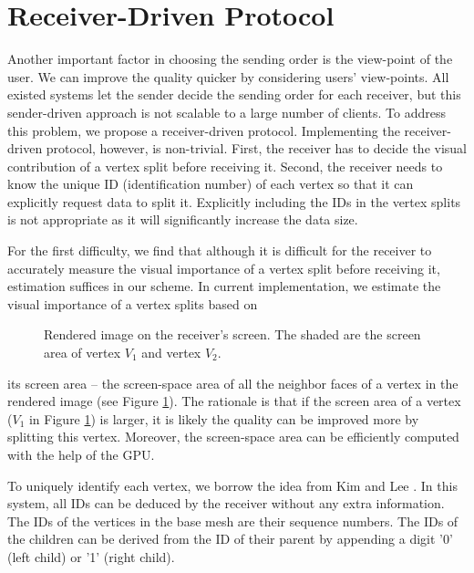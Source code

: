 \documentclass{sig-alt-release2}
\begin{document}
\section{Receiver-Driven Protocol}
\label{c:view}
    Another important factor in choosing the sending order is the view-point of the user.
    We can improve the quality quicker by considering users' view-points. 
    All existed systems let the sender decide the sending order for each receiver, but
    this sender-driven approach is not scalable to a large number of clients. 
    To address this problem, we 
    propose a receiver-driven protocol. 
    Implementing the receiver-driven protocol, however, is non-trivial. 
    First, the receiver has to decide the visual contribution
    of a vertex split before receiving it.
    Second, the receiver needs to know the unique ID (identification number)
    of each vertex so that it
    can explicitly request data to split it. 
    Explicitly
    including the IDs in the vertex splits is not appropriate as it will significantly
    increase the data size.
    
    For the first difficulty, we find that
    although it is difficult for the receiver to accurately measure
    the visual importance of a vertex split before receiving it, estimation suffices
    in our scheme. In current implementation, we estimate
    the visual importance of a vertex splits based on
    \begin{figure}
    \centering
    \caption{%
    Rendered image on the receiver's screen. 
    The shaded are the screen area of vertex $V_1$ and vertex $V_2$.
    \label{screen_area}}
    \end{figure}
    its screen area -- the screen-space area of all the neighbor faces of
    a vertex in the rendered image 
    (see Figure \ref{screen_area}).
    The rationale is that if the screen area of a vertex ($V_1$ in Figure \ref{screen_area}) 
    is larger, it is likely the quality can
    be improved more by splitting this vertex. 
    Moreover, the screen-space area can be efficiently
    computed with the help of the GPU.
    
    To uniquely identify each vertex, we borrow the idea from Kim and Lee \cite{kim01truly}.
    In this system,
    all IDs can be deduced by the receiver without any extra information. The IDs of the vertices
    in the base mesh are their sequence numbers. The IDs of the children can be derived from the
    ID of their parent by appending a digit '0' (left child) or '1' (right child).
    
\end{document}
